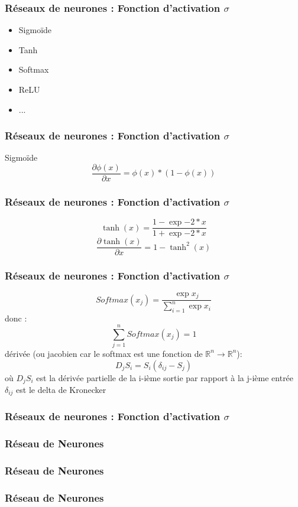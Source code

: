 \documentclass{formation}
\begin{document}
\begin{frame}
  \frametitle{Réseaux de neurones : Fonction d'activation $\sigma$}
  \begin{itemize}
  \item Sigmoïde
  \item Tanh
  \item Softmax
  \item ReLU
  \item ...
  \end{itemize}
\end{frame}

\begin{frame}
  \frametitle{Réseaux de neurones : Fonction d'activation $\sigma$}
  Sigmoïde
  \[
  \frac{\partial{\phi(x)}}{\partial{x}}=\phi(x)*(1-\phi(x))
  \]
\end{frame}

\begin{frame}
  \frametitle{Réseaux de neurones : Fonction d'activation $\sigma$}
  \[
  \tanh(x)=\frac{1-\exp{-2*x}}{1+\exp{-2*x}}
  \]
  \[
  \frac{\partial{\tanh(x)}}{\partial{x}}=1-\tanh^2(x)
  \]
\end{frame}

\begin{frame}
  \frametitle{Réseaux de neurones : Fonction d'activation $\sigma$}
  \[
  \mathit{Softmax}(x_j)=\frac{\exp{x_j}}{\sum_{i=1}^n{\exp{x_i}}}
  \]
  donc :
  \[
  \sum_{j=1}^n{\mathit{Softmax}(x_j)}=1
  \]
  dérivée (ou jacobien car le softmax est une fonction de $\mathbb{R}^n\rightarrow\mathbb{R}^n$):
  \[
  D_jS_i = S_i(\delta_{ij}-S_j)
  \]
  où
  $D_jS_i$ est la dérivée partielle de la i-ième sortie par rapport à la j-ième entrée
  \newline
  $\delta_{ij}$ est le delta de Kronecker
\end{frame}

\begin{frame}
  \frametitle{Réseaux de neurones : Fonction d'activation $\sigma$}
\end{frame}

\begin{frame}
  \frametitle{Réseau de Neurones}
\end{frame}

\begin{frame}
  \frametitle{Réseau de Neurones}
\end{frame}

\begin{frame}
  \frametitle{Réseau de Neurones}
\end{frame}
\end{document}

